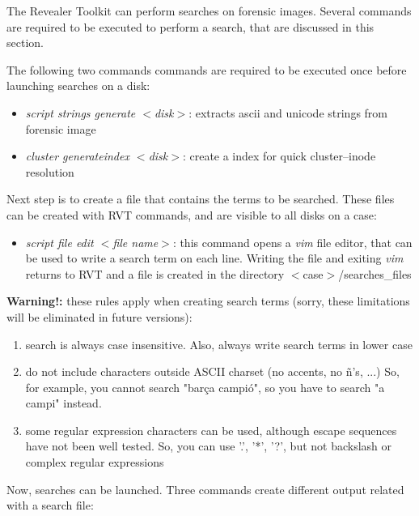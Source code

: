 \documentclass[a4paper,11pt,oneside]{report}
\begin{document}
The Revealer Toolkit can perform searches on forensic images. Several commands are required to be executed to perform a search, that are discussed in this section.

The following two commands commands are required to be executed once before launching searches on a disk:

\begin{itemize}
\item \emph{script strings generate $<$disk$>$}:  extracts ascii and unicode strings from forensic image 
\item \emph{cluster generateindex $<$disk$>$}:  create a index for quick cluster--inode resolution
\end{itemize}

Next step is to create a file that contains the terms to be searched. These files can be created with RVT commands, and are visible to all disks on a case:

\begin{itemize}
\item \emph{script file edit $<$file name$>$}: this command opens a \emph{vim} file editor, that can be used to write a search term on each line. Writing the file and exiting \emph{vim} returns to RVT and a file is created in the directory $<$case$>$/searches\_files 
\end{itemize}

\textbf{Warning!:}  these rules apply when creating search terms (sorry, these limitations will be eliminated in future versions):

\begin{enumerate}
\item search is always case insensitive. Also, always write search terms in lower case
\item do not include characters outside ASCII charset (no accents, no ñ's, ...) So, for example, you cannot search "barça campió", so you have to search "a campi" instead. 
\item some regular expression characters can be used, although escape sequences have not been well tested. So, you can use '.', '*', '?', but not backslash or complex regular expressions 
\end{enumerate}

Now, searches can be launched. Three commands create different output related with a search file:
\end{document}

